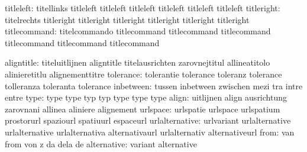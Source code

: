                 titleleft: titellinks                titleleft    %
                           titleleft                 titleleft
                           titleleft                 titleleft
                           titleleft
               titleright: titelrechts               titleright   %
                           titleright                titleright
                           titleright                titleright
                           titleright
             titlecommand: titelcommando             titlecommand %
                           titlecommand              titlecommand
                           titlecommand              titlecommand
                           titlecommand

               aligntitle: titeluitlijnen            aligntitle
                           titelausrichten           zarovnejtitul
                           allineatitolo             alinieretitlu
                           alignementtitre
                tolerance: tolerantie                tolerance
                           toleranz                  tolerance
                           tolleranza                toleranta
                           tolerance
                inbetween: tussen                    inbetween
                           zwischen                  mezi
                           tra                       intre
                           entre
                     type: type                      type
                           typ                       typ
                           type                      type
                           type
                    align: uitlijnen                 align
                           ausrichtung               zarovnani
                           allinea                   aliniere
                           alignement
                 urlspace: urlspatie                 urlspace
                           urlspatium                prostorurl
                           spaziourl                 spatiuurl
                           espaceurl
           urlalternative: urlvariant                urlalternative
                           urlalternative            urlalternativa
                           alternativaurl            urlalternativ
                           alternativeurl
                     from: van                       from
                           von                       z
                           da                        dela
                           de
              alternative: variant                   alternative
